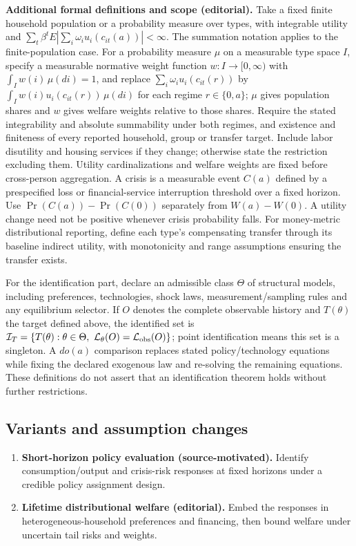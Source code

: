 \documentclass[11pt,a4paper]{article}
\begin{document}
\textbf{Additional formal definitions and scope (editorial).} Take a fixed finite household population or a probability measure over types, with integrable utility and \(\sum_t\beta^t E|\sum_i\omega_i u_i(c_{it}(a))|<\infty\). The summation notation applies to the finite-population case. For a probability measure \(\mu\) on a measurable type space \(I\), specify a measurable normative weight function \(w:I\to[0,\infty)\) with \(\int_I w(i)\,\mu(di)=1\), and replace \(\sum_i\omega_i u_i(c_{it}(r))\) by \(\int_I w(i)u_i(c_{it}(r))\,\mu(di)\) for each regime \(r\in\{0,a\}\); \(\mu\) gives population shares and \(w\) gives welfare weights relative to those shares. Require the stated integrability and absolute summability under both regimes, and existence and finiteness of every reported household, group or transfer target. Include labor disutility and housing services if they change; otherwise state the restriction excluding them. Utility cardinalizations and welfare weights are fixed before cross-person aggregation. A crisis is a measurable event \(C(a)\) defined by a prespecified loss or financial-service interruption threshold over a fixed horizon. Use \(\Pr(C(a))-\Pr(C(0))\) separately from \(W(a)-W(0)\). A utility change need not be positive whenever crisis probability falls. For money-metric distributional reporting, define each type's compensating transfer through its baseline indirect utility, with monotonicity and range assumptions ensuring the transfer exists.

For the identification part, declare an admissible class \(\Theta\) of structural models, including preferences, technologies, shock laws, measurement/sampling rules and any equilibrium selector. If \(O\) denotes the complete observable history and \(T(\theta)\) the target defined above, the identified set is \(\mathcal I_T=\{T(\theta):\theta\in\Theta,\ \mathcal L_\theta(O)=\mathcal L_{\rm obs}(O)\}\); point identification means this set is a singleton. A \(do(a)\) comparison replaces stated policy/technology equations while fixing the declared exogenous law and re-solving the remaining equations. These definitions do not assert that an identification theorem holds without further restrictions.
\subsection*{Variants and assumption changes}
\begin{enumerate}
\item \textbf{Short-horizon policy evaluation (source-motivated).} Identify consumption/output and crisis-risk responses at fixed horizons under a credible policy assignment design.
\item \textbf{Lifetime distributional welfare (editorial).} Embed the responses in heterogeneous-household preferences and financing, then bound welfare under uncertain tail risks and weights.
\end{enumerate}
\end{document}
